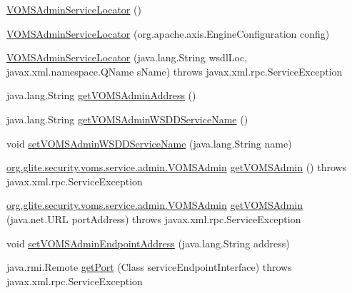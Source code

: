 \begin{DoxyCompactItemize}
\item 
\hyperlink{classorg_1_1glite_1_1security_1_1voms_1_1service_1_1admin_1_1VOMSAdminServiceLocator_a219781270cf92256001da6206d3834bc}{VOMSAdminServiceLocator} ()
\item 
\hyperlink{classorg_1_1glite_1_1security_1_1voms_1_1service_1_1admin_1_1VOMSAdminServiceLocator_a700fcfa6c12e49da139e114ec3d3aee8}{VOMSAdminServiceLocator} (org.apache.axis.EngineConfiguration config)
\item 
\hyperlink{classorg_1_1glite_1_1security_1_1voms_1_1service_1_1admin_1_1VOMSAdminServiceLocator_a67101d07d4f9d8cdc8936b18ecbba408}{VOMSAdminServiceLocator} (java.lang.String wsdlLoc, javax.xml.namespace.QName sName)  throws javax.xml.rpc.ServiceException 
\item 
java.lang.String \hyperlink{classorg_1_1glite_1_1security_1_1voms_1_1service_1_1admin_1_1VOMSAdminServiceLocator_a9aa20e106732f35e8180750326cb033f}{getVOMSAdminAddress} ()
\item 
java.lang.String \hyperlink{classorg_1_1glite_1_1security_1_1voms_1_1service_1_1admin_1_1VOMSAdminServiceLocator_abb4a267178077063d27cbcb7aaf621aa}{getVOMSAdminWSDDServiceName} ()
\item 
void \hyperlink{classorg_1_1glite_1_1security_1_1voms_1_1service_1_1admin_1_1VOMSAdminServiceLocator_a06c7c211cf04b1c2646f7bd389210c50}{setVOMSAdminWSDDServiceName} (java.lang.String name)
\item 
\hyperlink{interfaceorg_1_1glite_1_1security_1_1voms_1_1service_1_1admin_1_1VOMSAdmin}{org.glite.security.voms.service.admin.VOMSAdmin} \hyperlink{classorg_1_1glite_1_1security_1_1voms_1_1service_1_1admin_1_1VOMSAdminServiceLocator_a2ed7cc83a0ba2ed7d65aa7a97eebe4fd}{getVOMSAdmin} ()  throws javax.xml.rpc.ServiceException 
\item 
\hyperlink{interfaceorg_1_1glite_1_1security_1_1voms_1_1service_1_1admin_1_1VOMSAdmin}{org.glite.security.voms.service.admin.VOMSAdmin} \hyperlink{classorg_1_1glite_1_1security_1_1voms_1_1service_1_1admin_1_1VOMSAdminServiceLocator_af9230883ddc8118ab6ea6960b3d3b370}{getVOMSAdmin} (java.net.URL portAddress)  throws javax.xml.rpc.ServiceException 
\item 
void \hyperlink{classorg_1_1glite_1_1security_1_1voms_1_1service_1_1admin_1_1VOMSAdminServiceLocator_a9f8a71c0d0810a4430596ab94950847d}{setVOMSAdminEndpointAddress} (java.lang.String address)
\item 
java.rmi.Remote \hyperlink{classorg_1_1glite_1_1security_1_1voms_1_1service_1_1admin_1_1VOMSAdminServiceLocator_a5fb2e26694d7fe37047324a67a699fc1}{getPort} (Class serviceEndpointInterface)  throws javax.xml.rpc.ServiceException 

\end{DoxyCompactItemize}
